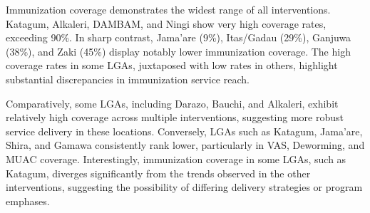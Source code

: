 \documentclass[
  11pt,
]{report}
\begin{document}
Immunization coverage demonstrates the widest range of all
interventions. Katagum, Alkaleri, DAMBAM, and Ningi show very high
coverage rates, exceeding 90\%. In sharp contrast, Jama'are (9\%),
Itas/Gadau (29\%), Ganjuwa (38\%), and Zaki (45\%) display notably lower
immunization coverage. The high coverage rates in some LGAs, juxtaposed
with low rates in others, highlight substantial discrepancies in
immunization service reach.

Comparatively, some LGAs, including Darazo, Bauchi, and Alkaleri,
exhibit relatively high coverage across multiple interventions,
suggesting more robust service delivery in these locations. Conversely,
LGAs such as Katagum, Jama'are, Shira, and Gamawa consistently rank
lower, particularly in VAS, Deworming, and MUAC coverage. Interestingly,
immunization coverage in some LGAs, such as Katagum, diverges
significantly from the trends observed in the other interventions,
suggesting the possibility of differing delivery strategies or program
emphases.
\end{document}

